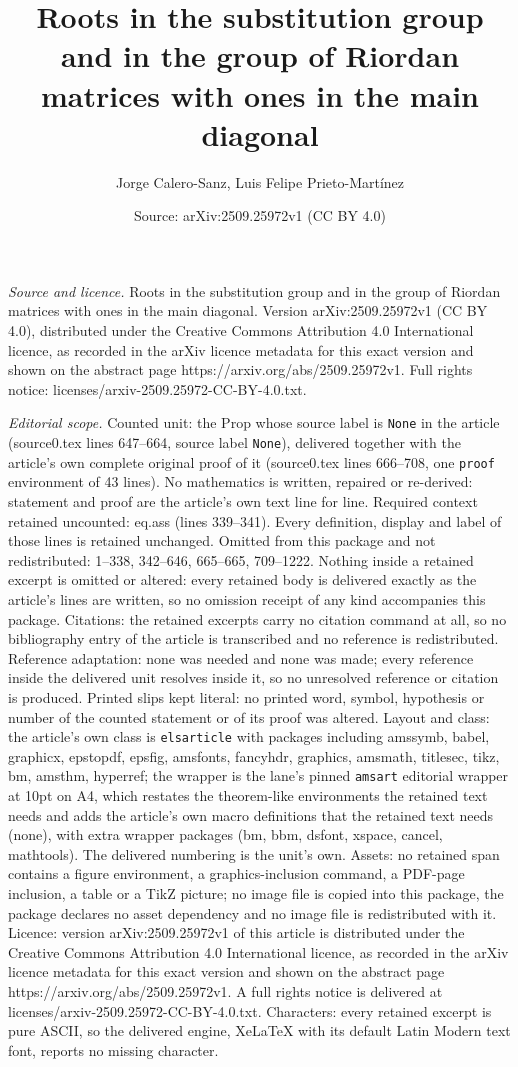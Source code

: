 \documentclass[10pt,a4paper]{amsart}
\title[Roots in the substitution group and in the group of Riordan ]{Roots in the substitution group and in the group of Riordan matrices with ones in the main diagonal}
\author{Jorge Calero-Sanz, Luis Felipe Prieto-Mart\'inez}
\date{Source: arXiv:2509.25972v1 (CC BY 4.0)}
\begin{document}
\maketitle

\noindent\emph{Source and licence.} Roots in the substitution group and in the group of Riordan matrices with ones in the main diagonal. Version arXiv:2509.25972v1 (CC BY 4.0), distributed under the Creative Commons Attribution 4.0 International licence, as recorded in the arXiv licence metadata for this exact version and shown on the abstract page https://arxiv.org/abs/2509.25972v1. Full rights notice: licenses/arxiv-2509.25972-CC-BY-4.0.txt.\par\smallskip

\noindent\textit{Editorial scope.} Counted unit: the Prop whose source label is \texttt{None} in the article (source0.tex lines 647--664, source label \texttt{None}), delivered together with the article's own complete original proof of it (source0.tex lines 666--708, one \texttt{proof} environment of 43 lines). No mathematics is written, repaired or re-derived: statement and proof are the article's own text line for line. Required context retained uncounted: eq.ass (lines 339--341). Every definition, display and label of those lines is retained unchanged. Omitted from this package and not redistributed: 1--338, 342--646, 665--665, 709--1222. Nothing inside a retained excerpt is omitted or altered: every retained body is delivered exactly as the article's lines are written, so no omission receipt of any kind accompanies this package. Citations: the retained excerpts carry no citation command at all, so no bibliography entry of the article is transcribed and no reference is redistributed. Reference adaptation: none was needed and none was made; every reference inside the delivered unit resolves inside it, so no unresolved reference or citation is produced. Printed slips kept literal: no printed word, symbol, hypothesis or number of the counted statement or of its proof was altered. Layout and class: the article's own class is \texttt{elsarticle} with packages including amssymb, babel, graphicx, epstopdf, epsfig, amsfonts, fancyhdr, graphics, amsmath, titlesec, tikz, bm, amsthm, hyperref; the wrapper is the lane's pinned \texttt{amsart} editorial wrapper at 10pt on A4, which restates the theorem-like environments the retained text needs and adds the article's own macro definitions that the retained text needs (none), with extra wrapper packages (bm, bbm, dsfont, xspace, cancel, mathtools). The delivered numbering is the unit's own. Assets: no retained span contains a figure environment, a graphics-inclusion command, a PDF-page inclusion, a table or a TikZ picture; no image file is copied into this package, the package declares no asset dependency and no image file is redistributed with it. Licence: version arXiv:2509.25972v1 of this article is distributed under the Creative Commons Attribution 4.0 International licence, as recorded in the arXiv licence metadata for this exact version and shown on the abstract page https://arxiv.org/abs/2509.25972v1. A full rights notice is delivered at licenses/arxiv-2509.25972-CC-BY-4.0.txt. Characters: every retained excerpt is pure ASCII, so the delivered engine, XeLaTeX with its default Latin Modern text font, reports no missing character.
\end{document}
